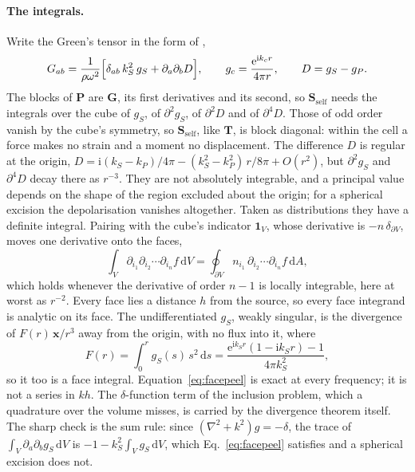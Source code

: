 \documentclass[11pt,a4paper]{article}
\newcommand{\bS}{\mathbf{S}}
\newcommand{\bT}{\mathbf{T}}
\newcommand{\bP}{\mathbf{P}}
\newcommand{\bG}{\mathbf{G}}
\newcommand{\dd}{\mathrm{d}}
\begin{document}
\paragraph{The integrals.} Write the Green's tensor in the form of \citet{Kupradze1963},
\begin{equation}\label{eq:kupradze}
  G_{ab}=\frac{1}{\rho\omega^2}\Bigl[\delta_{ab}\,k_S^2\,g_S+\partial_a\partial_b D\Bigr],
  \qquad g_c=\frac{\mathrm{e}^{\mathrm{i}k_cr}}{4\pi r},\qquad D=g_S-g_P .
\end{equation}
The blocks of $\bP$ are $\bG$, its first derivatives and its second, so
$\bS_{\text{self}}$ needs the integrals over the cube of $g_S$, of $\partial^2g_S$, of $\partial^2D$ and of
$\partial^4D$. Those of odd order vanish by the cube's symmetry, so $\bS_{\text{self}}$, like $\bT$, is block
diagonal: within the cell a force makes no strain and a moment no displacement. The difference $D$ is
regular at the origin, $D=\mathrm{i}(k_S-k_P)/4\pi-(k_S^2-k_P^2)\,r/8\pi+O(r^2)$, but $\partial^2g_S$ and
$\partial^4D$ decay there as $r^{-3}$. They are not absolutely integrable, and a principal value depends on
the shape of the region excluded about the origin; for a spherical excision the depolarisation vanishes
altogether. Taken as distributions they have a definite integral. Pairing with the cube's indicator
$\mathbf 1_V$, whose derivative is $-n\,\delta_{\partial V}$, moves one derivative onto the faces,
\begin{equation}\label{eq:facepeel}
  \int_V\partial_{i_1}\partial_{i_2}\cdots\partial_{i_n}f\,\dd V
  =\oint_{\partial V}n_{i_1}\,\partial_{i_2}\cdots\partial_{i_n}f\,\dd A ,
\end{equation}
which holds whenever the derivative of order $n-1$ is locally integrable, here at worst as $r^{-2}$.
Every face lies a distance $h$ from the source, so every face integrand is analytic on its face. The
undifferentiated $g_S$, weakly singular, is the divergence of $F(r)\,\mathbf x/r^3$ away from the origin,
with no flux into it, where
\begin{equation}\label{eq:radialF}
  F(r)=\int_0^r g_S(s)\,s^2\,\dd s=\frac{\mathrm{e}^{\mathrm{i}k_Sr}(1-\mathrm{i}k_Sr)-1}{4\pi k_S^2},
\end{equation}
so it too is a face integral. Equation~\eqref{eq:facepeel} is exact at every frequency; it is not a
series in $kh$. The $\delta$-function term of the inclusion problem, which a quadrature over the volume
misses, is carried by the divergence theorem itself. The sharp check is the sum rule: since
$(\nabla^2+k^2)g=-\delta$, the trace of $\int_V\partial_a\partial_bg_S\,\dd V$ is $-1-k_S^2\int_Vg_S\,\dd V$,
which Eq.~\eqref{eq:facepeel} satisfies and a spherical excision does not.
\end{document}
